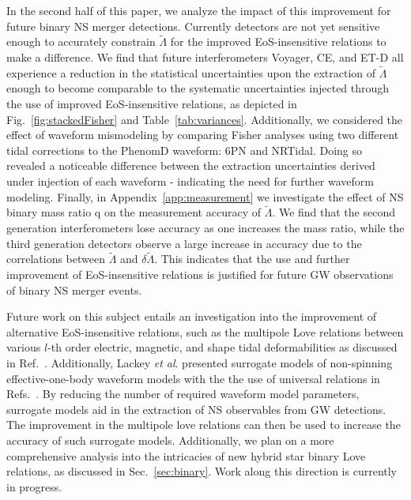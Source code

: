 \documentclass[prd,twocolumn,nofootinbib,superscriptaddress,amsmath,amssymb]{revtex4-1}
\begin{document}
In the second half of this paper, we analyze the impact of this improvement for future binary NS merger detections.
Currently detectors are not yet sensitive enough to accurately constrain $\tilde{\Lambda}$ for the improved EoS-insensitive relations to make a difference.
We find that future interferometers Voyager, CE, and ET-D all experience a reduction in the statistical uncertainties upon the extraction of $\tilde{\Lambda}$ enough to become comparable to the systematic uncertainties injected through the use of improved EoS-insensitive relations, as depicted in Fig.~\ref{fig:stackedFisher} and Table~\ref{tab:variances}.
Additionally, we considered the effect of waveform mismodeling by comparing Fisher analyses using two different tidal corrections to the PhenomD waveform: 6PN and NRTidal.
Doing so revealed a noticeable difference between the extraction uncertainties derived under injection of each waveform - indicating the need for further waveform modeling.
Finally, in Appendix~\ref{app:measurement} we investigate the effect of NS binary mass ratio q on the measurement accuracy of $\tilde\Lambda$.
We find that the second generation interferometers lose accuracy as one increases the mass ratio, while the third generation detectors observe a large increase in accuracy due to the correlations between $\tilde\Lambda$ and $\delta\tilde\Lambda$.
This indicates that the use and further improvement of EoS-insensitive relations is justified for future GW observations of binary NS merger events.

Future work on this subject entails an investigation into the improvement of alternative EoS-insensitive relations, such as the multipole Love relations between various $l$-th order electric, magnetic, and shape tidal deformabilities as discussed in Ref.~\cite{Yagi:Multipole}.
Additionally, Lackey \emph{et al}. presented surrogate models of non-spinning effective-one-body waveform models with the the use of universal relations in Refs.~\cite{Lackey:Surrogate, Lackey:EOB}.
By reducing the number of required waveform model parameters, surrogate models aid in the extraction of NS observables from GW detections.
The improvement in the multipole love relations can then be used to increase the accuracy of such surrogate models.
Additionally, we plan on a more comprehensive analysis into the intricacies of new hybrid star binary Love relations, as discussed in Sec.~\ref{sec:binary}.
Work along this direction is currently in progress.

\end{document}
